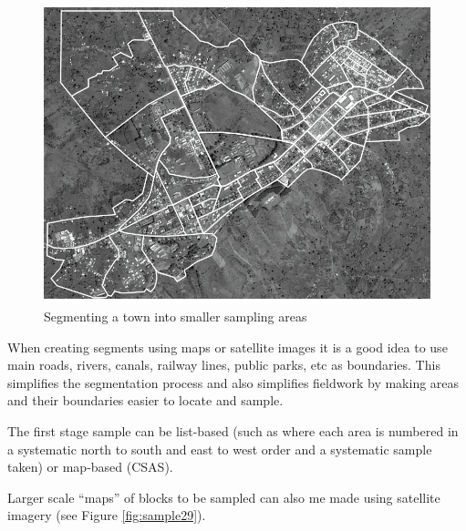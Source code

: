 \documentclass[12pt,a4paper]{book}
\theoremstyle{definition}
\theoremstyle{definition}
\theoremstyle{definition}
\theoremstyle{remark}
\begin{document}
\begin{figure}[H]

{\centering \includegraphics[width=800pt]{figures/stage2sample14} 

}

\caption{Segmenting a town into smaller sampling areas}\label{fig:sample28}
\end{figure}

When creating segments using maps or satellite images it is a good idea
to use main roads, rivers, canals, railway lines, public parks, etc as
boundaries. This simplifies the segmentation process and also simplifies
fieldwork by making areas and their boundaries easier to locate and
sample.

The first stage sample can be list-based (such as where each area is
numbered in a systematic north to south and east to west order and a
systematic sample taken) or map-based (CSAS).

Larger scale ``maps'' of blocks to be sampled can also me made using
satellite imagery (see Figure \ref{fig:sample29}).
\end{document}
